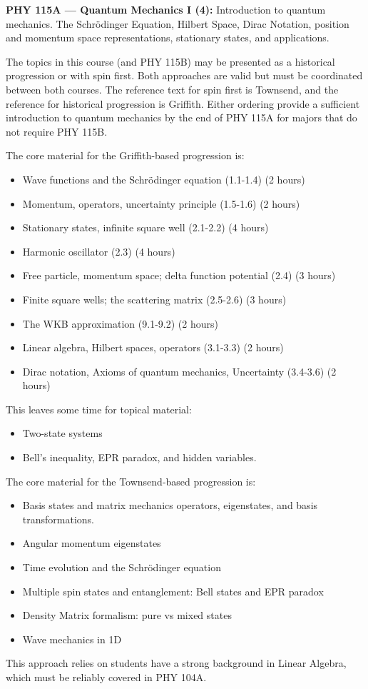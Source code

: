 \documentclass[12pt]{article}
\begin{document}
\vskip 1cm
\noindent
{\bf PHY 115A --- Quantum Mechanics I (4):}
Introduction to quantum mechanics.  The Schr\"odinger Equation, Hilbert
Space, Dirac Notation, position and momentum space representations,
stationary states, and applications.

The topics in this course (and PHY 115B) may be presented as a
historical progression or with spin first.  Both approaches are valid
but must be coordinated between both courses.  The reference text for
spin first is Townsend, and the reference for historical progression is
Griffith.  Either ordering provide a sufficient introduction to
quantum mechanics by the end of PHY 115A for majors that do not
require PHY 115B.

The core material for the Griffith-based progression is: 
\begin{itemize}
\item Wave functions and the Schr\"odinger equation (1.1-1.4) (2 hours)
\item Momentum, operators, uncertainty principle (1.5-1.6) (2 hours)
\item Stationary states, infinite square well (2.1-2.2) (4 hours)
\item Harmonic oscillator (2.3) (4 hours)
\item Free particle, momentum space; delta function potential (2.4) (3 hours)
\item Finite square wells; the scattering matrix (2.5-2.6) (3 hours)
\item The WKB approximation (9.1-9.2) (2 hours)
\item Linear algebra, Hilbert spaces, operators (3.1-3.3) (2 hours)
\item Dirac notation, Axioms of quantum mechanics, Uncertainty  (3.4-3.6) (2 hours)
\end{itemize}
This leaves some time for topical material:
\begin{itemize}
\item Two-state systems
\item Bell's inequality, EPR paradox, and hidden variables.
\end{itemize}

The core material for the Townsend-based progression is: 
\begin{itemize}
\item Basis states and matrix mechanics operators, eigenstates, and
  basis transformations.
\item Angular momentum eigenstates
\item Time evolution and the Schr\"odinger equation
\item Multiple spin states and entanglement: Bell states and EPR paradox
\item Density Matrix formalism: pure vs mixed states
\item Wave mechanics in 1D
\end{itemize}
This approach relies on students have a strong background in Linear Algebra, which must be reliably covered in PHY 104A.
\end{document}
